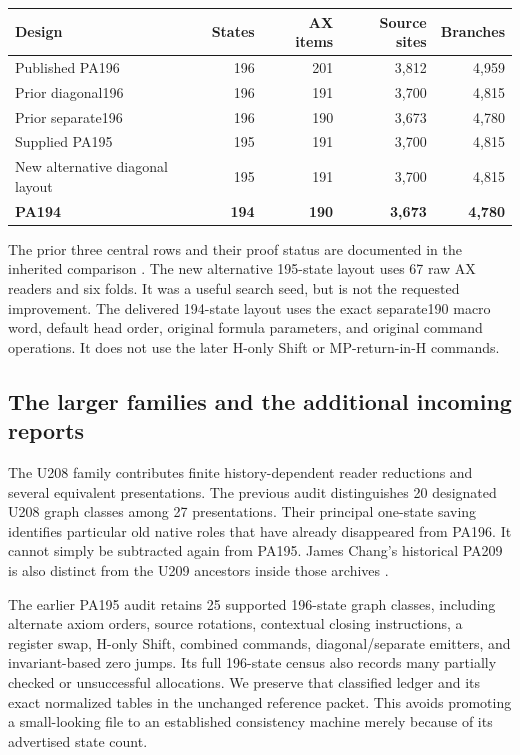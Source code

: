 \documentclass[11pt,letterpaper]{article}
\begin{document}
\begin{center}\small
\begin{tabular}{@{}lrrrr@{}}
\toprule
Design & States & AX items & Source sites & Branches\\
\midrule
Published PA196 &196&201&3,812&4,959\\
Prior diagonal196 &196&191&3,700&4,815\\
Prior separate196 &196&190&3,673&4,780\\
Supplied PA195 &195&191&3,700&4,815\\
New alternative diagonal layout &195&191&3,700&4,815\\
\textbf{PA194} &\textbf{194}&\textbf{190}&\textbf{3,673}&\textbf{4,780}\\
\bottomrule
\end{tabular}
\end{center}
The prior three central rows and their proof status are documented in
the inherited comparison \cite{pa195,separate}. The new alternative
195-state layout uses 67 raw AX readers and six folds. It was a useful
search seed, but is not the requested improvement. The delivered
194-state layout uses the exact separate190 macro word, default head
order, original formula parameters, and original command operations.
It does not use the later H-only Shift or MP-return-in-H commands.

\subsection{The larger families and the additional incoming reports}
The U208 family contributes finite history-dependent reader reductions
and several equivalent presentations. The previous audit distinguishes
20 designated U208 graph classes among 27 presentations. Their principal
one-state saving identifies particular old native roles that have
already disappeared from PA196. It cannot simply be subtracted again
from PA195. James Chang's historical PA209 is also distinct from the
U209 ancestors inside those archives \cite{pa195,upstream}.

The earlier PA195 audit retains 25 supported 196-state graph classes,
including alternate axiom orders, source rotations, contextual closing
instructions, a register swap, H-only Shift, combined commands,
diagonal/separate emitters, and invariant-based zero jumps. Its full
196-state census also records many partially checked or unsuccessful
allocations. We preserve that classified ledger and its exact normalized
tables in the unchanged reference packet. This avoids promoting a
small-looking file to an established consistency machine merely because
of its advertised state count.
\end{document}
